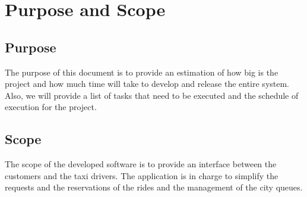 \documentclass[../../../../testPlan.tex]{subfiles}
\begin{document}
	\section{Purpose and Scope}

		\subsection{Purpose}
			The purpose of this document is to provide an estimation of how big is the project and how much time will take to develop and release the entire system.
			Also, we will provide a list of tasks that need to be executed and the schedule of execution for the project.

		\subsection{Scope}
			The scope of the developed software is to provide an interface between the customers and the taxi drivers. The application is in charge to simplify the requests and the reservations of the rides and the management of the city queues.
\end{document}
